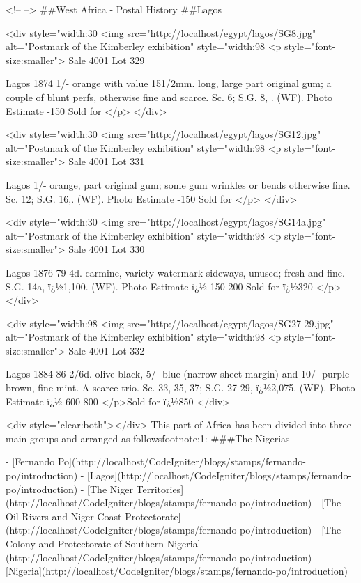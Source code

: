 
<!-- -->
\#\#West Africa - Postal History
\#\#Lagos



<div style="width:30%
<img src="http://localhost/egypt/lagos/SG8.jpg" 
alt="Postmark of the Kimberley exhibition" style="width:98%
<p style="font-size:smaller"> 
Sale 4001 Lot 329

Lagos
1874 1/- orange with value 151/2mm. long, large part original gum; a couple of blunt perfs, otherwise fine and scarce. Sc. 6; S.G. 8, . (WF). Photo
Estimate -150 Sold for 
</p>
</div>

<div style="width:30%
<img src="http://localhost/egypt/lagos/SG12.jpg" 
alt="Postmark of the Kimberley exhibition"  style="width:98%
<p style="font-size:smaller"> 
Sale 4001 Lot 331

Lagos
 1/- orange, part original gum; some gum wrinkles or bends otherwise fine. Sc. 12; S.G. 16,. (WF). Photo
Estimate -150 Sold for 
</p>
</div>

<div style="width:30%
<img src="http://localhost/egypt/lagos/SG14a.jpg" 
alt="Postmark of the Kimberley exhibition"  style="width:98%
<p style="font-size:smaller"> 
Sale 4001 Lot 330

Lagos
1876-79 4d. carmine, variety watermark sideways, unused; fresh and fine. S.G. 14a, ï¿½1,100. (WF). Photo
Estimate ï¿½ 150-200 Sold for ï¿½320 
</p>
</div>

<div style="width:98%
<img src="http://localhost/egypt/lagos/SG27-29.jpg" 
alt="Postmark of the Kimberley exhibition"  style="width:98%
<p style="font-size:smaller"> 
Sale 4001 Lot 332

Lagos
1884-86 2/6d. olive-black, 5/- blue (narrow sheet margin) and 10/- purple-brown, fine mint. A scarce trio. Sc. 33, 35, 37; S.G. 27-29, ï¿½2,075. (WF). Photo
Estimate ï¿½ 600-800 
</p>Sold for ï¿½850
</div>

<div style="clear:both"></div>
This part of Africa has been divided into three main groups and arranged as followsfootnote:1:
\#\#\#The Nigerias

- [Fernando Po](http://localhost/CodeIgniter/blogs/stamps/fernando-po/introduction)
- [Lagos](http://localhost/CodeIgniter/blogs/stamps/fernando-po/introduction)
- [The Niger Territories](http://localhost/CodeIgniter/blogs/stamps/fernando-po/introduction)
- [The Oil Rivers and Niger Coast Protectorate](http://localhost/CodeIgniter/blogs/stamps/fernando-po/introduction)
- [The Colony and Protectorate of Southern Nigeria](http://localhost/CodeIgniter/blogs/stamps/fernando-po/introduction)
- [Nigeria](http://localhost/CodeIgniter/blogs/stamps/fernando-po/introduction)


